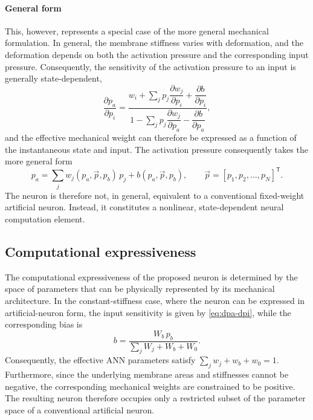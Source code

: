 \documentclass[11pt,a4paper]{article}
\numberwithin{equation}{section}
\begin{document}
\paragraph{General form}

This, however, represents a special case of the more general mechanical formulation. In general, the membrane
stiffness varies with deformation, and the deformation depends on both the activation pressure and the corresponding
input pressure. Consequently, the sensitivity of the activation pressure to an input is generally state-dependent,
\begin{equation}
  \frac{\partial p_a}{\partial p_i} =
    \frac{w_i + \sum_j p_j \dfrac{\partial w_j}{\partial p_i} + \dfrac{\partial b}{\partial p_i}}
         {1 - \sum_j p_j \dfrac{\partial w_j}{\partial p_a} - \dfrac{\partial b}{\partial p_a}},
  \label{eq:general-sensitivity}
\end{equation}
and the effective mechanical weight can therefore be expressed as a function of the instantaneous state and input.
The activation pressure consequently takes the more general form
\begin{equation}
  p_a = \sum_j w_j(p_a, \vec{p}, p_b)\,p_j + b(p_a, \vec{p}, p_b), \qquad
  \vec{p} = [p_1, p_2, \ldots, p_N]^{\mathsf{T}} .
  \label{eq:general-form}
\end{equation}
The neuron is therefore not, in general, equivalent to a conventional fixed-weight artificial neuron. Instead, it
constitutes a nonlinear, state-dependent neural computation element.

\subsection{Computational expressiveness}

The computational expressiveness of the proposed neuron is determined by the space of parameters that can be
physically represented by its mechanical architecture. In the constant-stiffness case, where the neuron can be
expressed in artificial-neuron form, the input sensitivity is given by \cref{eq:dpa-dpi}, while the corresponding
bias is
\begin{equation*}
  b = \frac{W_b\,p_b}{\sum_j W_j + W_b + W_0} .
\end{equation*}
Consequently, the effective ANN parameters satisfy $\sum_j w_j + w_b + w_0 = 1$. Furthermore, since the underlying
membrane areas and stiffnesses cannot be negative, the corresponding mechanical weights are constrained to be
positive. The resulting neuron therefore occupies only a restricted subset of the parameter space of a conventional
artificial neuron.
\end{document}
